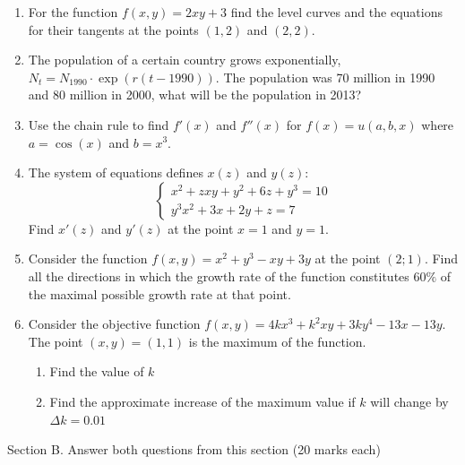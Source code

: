 \documentclass[12pt]{article} %
\theoremstyle{definition} %
\begin{document}
\begin{enumerate}

\item For the function $f(x,y)=2xy+3$ find the level curves and the equations for their tangents at the points $(1,2)$ and $(2, 2)$.

\item The population of a certain country grows exponentially, $N_t= N_{1990}\cdot \exp (r(t-1990))$. The population was 70 million in 1990 and 80 million in 2000,
what will be the population in 2013?

\item Use the chain rule to find $f'(x)$ and $f''(x)$ for $f(x)=u(a,b,x)$ where $a=\cos(x)$ and $b=x^3$.

\item The system of equations defines $x(z)$ and $y(z)$:
\begin{equation}
\begin{cases}
x^2+zxy+y^2+6z+y^3=10 \\
y^3x^2+3x+2y+z=7 \nonumber
\end{cases}
\end{equation}
Find $x'(z)$ and $y'(z)$ at the point $x=1$ and $y=1$.

\item Consider the function $f(x,y)=x^2+y^3-xy+3y$ at the point $(2;1)$. Find all the directions in which the  growth rate of the function constitutes $60\%$ of the maximal possible growth rate at that point.

\item Consider the objective function $f(x,y)=4kx^3+k^2xy+3ky^4-13x-13y$. The point $(x,y)=(1,1)$ is the maximum of the function.
\begin{enumerate}
\item Find the value of $k$
\item Find the approximate increase of the maximum value if $k$ will change by $\Delta k=0.01$
\end{enumerate}


\end{enumerate}

Section B. Answer both questions from this section (20 marks each)
\end{document}
